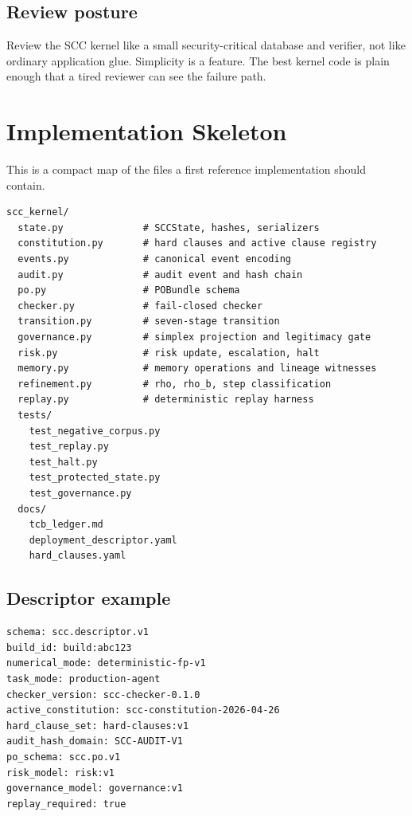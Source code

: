 \documentclass[11pt,oneside]{article}
\begin{document}
\subsection{Review posture}
Review the SCC kernel like a small security-critical database and verifier, not like ordinary application glue. Simplicity is a feature. The best kernel code is plain enough that a tired reviewer can see the failure path.


\section{Implementation Skeleton}
This is a compact map of the files a first reference implementation should contain.

\begin{lstlisting}[caption={Reference implementation layout.}]
scc_kernel/
  state.py              # SCCState, hashes, serializers
  constitution.py       # hard clauses and active clause registry
  events.py             # canonical event encoding
  audit.py              # audit event and hash chain
  po.py                 # POBundle schema
  checker.py            # fail-closed checker
  transition.py         # seven-stage transition
  governance.py         # simplex projection and legitimacy gate
  risk.py               # risk update, escalation, halt
  memory.py             # memory operations and lineage witnesses
  refinement.py         # rho, rho_b, step classification
  replay.py             # deterministic replay harness
  tests/
    test_negative_corpus.py
    test_replay.py
    test_halt.py
    test_protected_state.py
    test_governance.py
  docs/
    tcb_ledger.md
    deployment_descriptor.yaml
    hard_clauses.yaml
\end{lstlisting}

\subsection{Descriptor example}
\begin{lstlisting}[caption={Execution descriptor example.}]
schema: scc.descriptor.v1
build_id: build:abc123
numerical_mode: deterministic-fp-v1
task_mode: production-agent
checker_version: scc-checker-0.1.0
active_constitution: scc-constitution-2026-04-26
hard_clause_set: hard-clauses:v1
audit_hash_domain: SCC-AUDIT-V1
po_schema: scc.po.v1
risk_model: risk:v1
governance_model: governance:v1
replay_required: true
\end{lstlisting}
\end{document}
